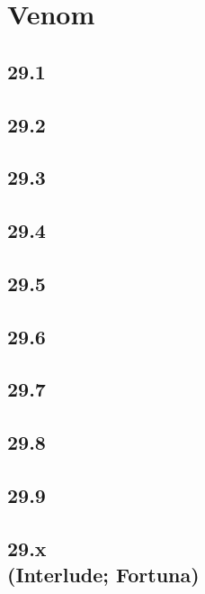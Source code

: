 \part{Venom}
 \chapter{29.1}
 \chapter{29.2}
 \chapter{29.3}
 \chapter{29.4}
 \chapter{29.5}
 \chapter{29.6}
 \chapter{29.7}
 \chapter{29.8}
 \chapter{29.9}
 \chapter[29.x (Interlude; Fortuna)]{29.x\\(Interlude; Fortuna)}











